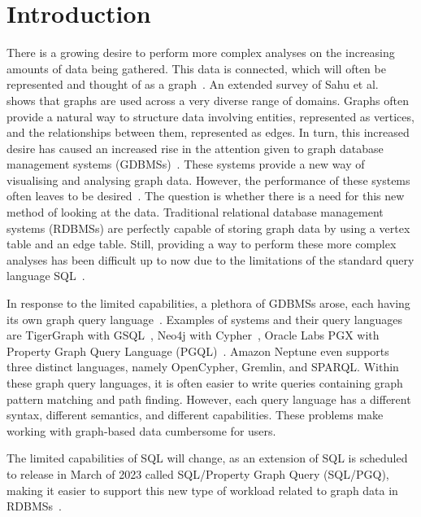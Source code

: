 \section{Introduction}\label{s:intro}
There is a growing desire to perform more complex analyses on the increasing amounts of data being gathered. 
This data is connected, which will often be represented and thought of as a  graph~\cite{DBLP:journals/debu/ShaoLWX17}.  
An extended survey of Sahu et al.~\cite{DBLP:journals/vldb/SahuMSLO20} shows that graphs are used across a very diverse range of domains. 
Graphs often provide a natural way to structure data involving entities, represented as vertices, and the relationships between them, represented as edges.
In turn, this increased desire has caused an increased rise in the attention given to graph database management systems (GDBMSs)~\cite{Fan2015TheCA}.
These systems provide a new way of visualising and analysing graph data.
However, the performance of these systems often leaves to be desired~\cite{DBLP:journals/pvldb/Ozsu19, Fan2015TheCA}. 
The question is whether there is a need for this new method of looking at the data.
Traditional relational database management systems (RDBMSs) are perfectly capable of storing graph data by using a vertex table and an edge table. 
Still, providing a way to perform these more complex analyses has been difficult up to now due to the limitations of the standard query language SQL~\cite{oracle-sql-example}.

In response to the limited capabilities, a plethora of GDBMSs arose, each having its own graph query language~\cite{DBLP:journals/corr/abs-1910-09017}.
Examples of systems and their query languages are TigerGraph with GSQL~\cite{tigergraph}, Neo4j with Cypher~\cite{Francis2018}, Oracle Labs PGX with Property Graph Query Language (PGQL)~\cite{10.1145/2960414.2960421}. Amazon Neptune even supports three distinct languages, namely OpenCypher, Gremlin, and SPARQL. 
Within these graph query languages, it is often easier to write queries containing graph pattern matching and path finding. 
However, each query language has a different syntax, different semantics, and different capabilities. 
These problems make working with graph-based data cumbersome for users.

The limited capabilities of SQL will change, as an extension of SQL is scheduled to release in March of 2023 called SQL/Property Graph Query (SQL/PGQ), making it easier to support this new type of workload related to graph data in RDBMSs~\cite{isosqlpgq}.

